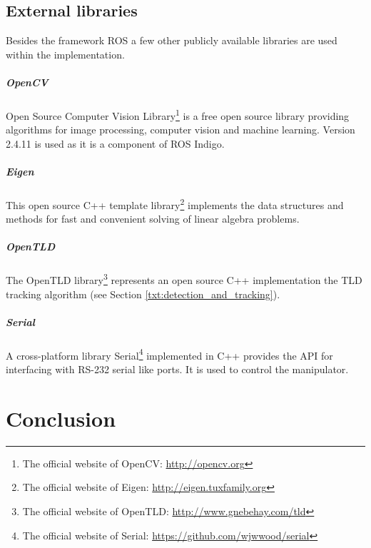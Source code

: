 \section{External libraries} \label{txt:external_libraries}

Besides the framework ROS a few other publicly available libraries are used within the implementation.

\paragraph{OpenCV} Open Source Computer Vision Library\footnote{The official website of OpenCV: \url{http://opencv.org}} is a free open source library providing algorithms for image processing, computer vision and machine learning. Version 2.4.11 is used as it is a component of ROS Indigo.

\paragraph{Eigen} This open source C++ template library\footnote{The official website of Eigen: \url{http://eigen.tuxfamily.org}} implements the data structures and methods for fast and convenient solving of linear algebra problems.

\paragraph{OpenTLD} The OpenTLD library\footnote{The official website of OpenTLD: \url{http://www.gnebehay.com/tld}} represents an open source C++ implementation the TLD tracking algorithm (see Section \ref{txt:detection_and_tracking}).	

\paragraph{Serial} A cross-platform library Serial\footnote{The official website of Serial: \url{https://github.com/wjwwood/serial}} implemented in C++ provides the API for interfacing with RS-232 serial like ports. It is used to control the manipulator.


\chapter{Conclusion} \label{txt:conclusion}

